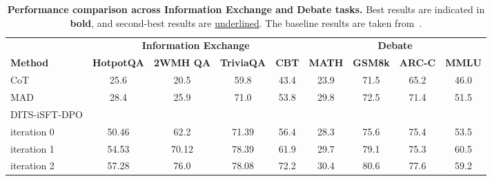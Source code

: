 \begin{table*}[t]
    \centering
    \caption{\textbf{Performance comparison across Information Exchange and Debate tasks.} Best results are indicated in \textbf{bold}, and second-best results are \underline{underlined}. The baseline results are taken from~\cite{DBLP:journals/corr/abs-2410-08115}.}
    \vskip 0.1in
    \begin{tabular}{lcccccccc}
    \toprule
    & \multicolumn{4}{c}{\textbf{Information Exchange}} & \multicolumn{4}{c}{\textbf{Debate}} \\
    \cmidrule(lr){2-5} \cmidrule(lr){6-9}
     \textbf{Method} & \multicolumn{1}{c}{\textbf{HotpotQA}} & \multicolumn{1}{c}{\textbf{2WMH QA}}  &\multicolumn{1}{c}{\textbf{TriviaQA}} & \multicolumn{1}{c}{\textbf{CBT}}& \multicolumn{1}{c}{\textbf{MATH}} & \multicolumn{1}{c}{\textbf{GSM8k}} & \multicolumn{1}{c}{\textbf{ARC-C}}&\multicolumn{1}{c}{\textbf{MMLU}} \\
    
    \midrule
    CoT & 25.6  &20.5  &59.8  &43.4 &23.9 & 71.5 & 65.2  & 46.0 \\
   
    \midrule
    MAD &  28.4  &25.9& 71.0 & 53.8 &29.8 & 72.5 & 71.4 & 51.5\\
  
      \midrule
    DITS-iSFT-DPO  &&&&&&&&\\
    iteration 0 &50.46 &62.2  &71.39 &56.4 & 28.3  & 75.6 & 75.4 & 53.5  \\
    iteration 1 &54.53 &70.12 &78.39 &61.9 & 29.7 &  79.1 & 75.3 & 60.5 \\
    iteration 2 &57.28 &76.0  &78.08 &72.2 & 30.4 & 80.6 & 77.6 & 59.2 \\

    \bottomrule
    \end{tabular}
    \label{tab:main-table}
\end{table*}